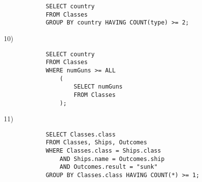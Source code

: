 \documentclass[10pt,a4paper]{article}
\begin{document}
\begin{enumerate}
\begin{verbatim}
            SELECT country
            FROM Classes
            GROUP BY country HAVING COUNT(type) >= 2;
        \end{verbatim}
        \item[10)]\begin{verbatim}
            SELECT country
            FROM Classes
            WHERE numGuns >= ALL
                (
                    SELECT numGuns
                    FROM Classes
                );
        \end{verbatim}
        \item[11)]\begin{verbatim}
            SELECT Classes.class
            FROM Classes, Ships, Outcomes
            WHERE Classes.class = Ships.class
                AND Ships.name = Outcomes.ship
                AND Outcomes.result = "sunk"
            GROUP BY Classes.class HAVING COUNT(*) >= 1;
        \end{verbatim}
    \end{enumerate}
\end{document}
